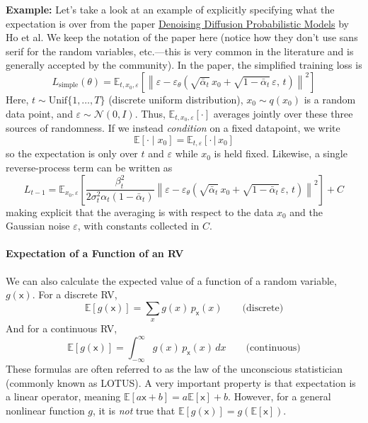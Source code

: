 \begin{exampleBox}
    \textbf{Example:} Let's take a look at an example of explicitly specifying what the expectation is over from the paper \href{https://arxiv.org/abs/2006.11239}{Denoising Diffusion Probabilistic Models} by Ho et al. We keep the notation of the paper here (notice how they don't use sans serif for the random variables, etc.---this is very common in the literature and is generally accepted by the community). In the paper, the simplified training loss is
    \begin{equation}
    L_{\text{simple}}(\theta)
    =\mathbb{E}_{t,x_0,\varepsilon}\!\left[
    \left\|\varepsilon-\varepsilon_\theta\!\left(\sqrt{\bar\alpha_t}\,x_0+\sqrt{1-\bar\alpha_t}\,\varepsilon,\,t\right)\right\|^2
    \right]
    \end{equation}
    Here, $t\sim\mathrm{Unif}\{1,\dots,T\}$ (discrete uniform distribution), $x_0\sim q(x_0)$ is a random data point, and $\varepsilon\sim\mathcal{N}(0,I)$. Thus, $\mathbb{E}_{t,x_0,\varepsilon}[\cdot]$ averages jointly over these three sources of randomness. If we instead \emph{condition} on a fixed datapoint, we write
    \begin{equation}
    \mathbb{E}\!\left[\cdot \mid x_0\right]=\mathbb{E}_{t,\varepsilon}\!\left[\cdot \,\big|\, x_0\right]
    \end{equation}
    so the expectation is only over $t$ and $\varepsilon$ while $x_0$ is held fixed. Likewise, a single reverse-process term can be written as
    \begin{equation}
    L_{t-1}
    =\mathbb{E}_{x_0,\varepsilon}\!\left[
    \frac{\beta_t^2}{2\sigma_t^2\alpha_t(1-\bar\alpha_t)}
    \left\|\varepsilon-\varepsilon_\theta\!\left(\sqrt{\bar\alpha_t}\,x_0+\sqrt{1-\bar\alpha_t}\,\varepsilon,\,t\right)\right\|^2
    \right]+C
    \end{equation}
    making explicit that the averaging is with respect to the data $x_0$ and the Gaussian noise $\varepsilon$, with constants collected in $C$.
\end{exampleBox}
    
    
\paragraph*{Expectation of a Function of an RV}
We can also calculate the expected value of a function of a random variable, $g(\mathsf{x})$. For a discrete RV,
\begin{equation}
\mathbb{E}[g(\mathsf{x})] = \sum_{x} g(x) \, p_{\mathsf{x}}(x) \qquad\text{(discrete)}
\end{equation}
And for a continuous RV,
\begin{equation}
\mathbb{E}[g(\mathsf{x})] = \int_{-\infty}^{\infty} g(x) \, p_{\mathsf{x}}(x)\,dx \qquad\text{(continuous)}
\end{equation}
These formulas are often referred to as the law of the unconscious statistician (commonly known as LOTUS). A very important property is that expectation is a linear operator, meaning $\mathbb{E}[a\mathsf{x} + b] = a\mathbb{E}[\mathsf{x}] + b$. However, for a general nonlinear function $g$, it is \emph{not} true that $\mathbb{E}[g(\mathsf{x})] = g(\mathbb{E}[\mathsf{x}])$.

